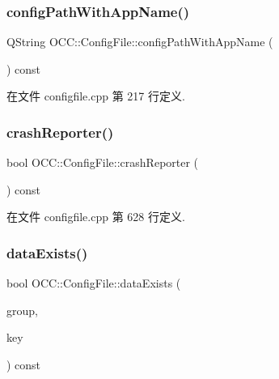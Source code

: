 \subsubsection{\texorpdfstring{config\+Path\+With\+App\+Name()}{configPathWithAppName()}}
{\footnotesize\ttfamily Q\+String O\+C\+C\+::\+Config\+File\+::config\+Path\+With\+App\+Name (\begin{DoxyParamCaption}{ }\end{DoxyParamCaption}) const}



在文件 configfile.\+cpp 第 217 行定义.

\mbox{\label{class_o_c_c_1_1_config_file_ab3d85f4bc38a77e8b48efd08040fc1c3}} 
\subsubsection{\texorpdfstring{crash\+Reporter()}{crashReporter()}}
{\footnotesize\ttfamily bool O\+C\+C\+::\+Config\+File\+::crash\+Reporter (\begin{DoxyParamCaption}{ }\end{DoxyParamCaption}) const}



在文件 configfile.\+cpp 第 628 行定义.

\mbox{\label{class_o_c_c_1_1_config_file_ae2c5b31e20035ccca6df56a83234d788}} 
\subsubsection{\texorpdfstring{data\+Exists()}{dataExists()}}
{\footnotesize\ttfamily bool O\+C\+C\+::\+Config\+File\+::data\+Exists (\begin{DoxyParamCaption}\item[{const Q\+String \&}]{group,  }\item[{const Q\+String \&}]{key }\end{DoxyParamCaption}) const\hspace{0.3cm}{\ttfamily [protected]}}



